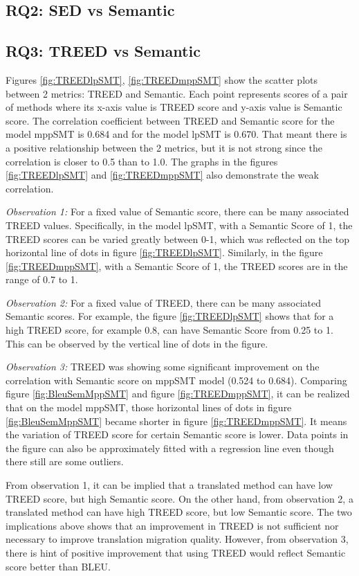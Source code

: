 \subsection{RQ2: SED vs Semantic}

\subsection{RQ3: TREED vs Semantic}
Figures \ref{fig:TREEDlpSMT}, \ref{fig:TREEDmppSMT}  show the scatter plots between 2 metrics: TREED and Semantic. Each point represents scores of a pair of methods where its x-axis value is TREED score and y-axis value is Semantic score.
The correlation coefficient between TREED and Semantic score for the model mppSMT is 0.684 and for the model lpSMT is 0.670. That meant there is a positive relationship between the 2 metrics, but it is not strong since the correlation is closer to 0.5 than to 1.0. The graphs in the figures  \ref{fig:TREEDlpSMT} and \ref{fig:TREEDmppSMT}  also demonstrate the weak correlation.

\emph{Observation 1:} For a fixed value of Semantic score, there can be many associated TREED values. Specifically, in the model lpSMT, with a Semantic Score of 1, the TREED scores can be varied greatly between 0-1, which was reflected on the top horizontal line of dots in figure \ref{fig:TREEDlpSMT}. Similarly, in the figure \ref{fig:TREEDmppSMT}, with a Semantic Score of 1, the TREED scores are in the range of 0.7 to 1. 

\emph{Observation 2:} For a fixed value of TREED, there can be many associated Semantic scores. For example, the figure \ref{fig:TREEDlpSMT} shows that for a high TREED score, for example 0.8, can have Semantic Score from 0.25 to 1. This can be observed by the vertical line of dots in the figure. 

\emph{Observation 3:} TREED was showing some significant improvement on the correlation with Semantic score on mppSMT model (0.524 to 0.684). Comparing figure \ref{fig:BleuSemMppSMT} and figure \ref{fig:TREEDmppSMT}, it can be realized that on the model mppSMT, those horizontal lines of dots in figure \ref{fig:BleuSemMppSMT} became shorter in figure \ref{fig:TREEDmppSMT}. It means the variation of TREED score for certain Semantic score is lower. Data points in the figure can also be approximately fitted with a regression line even though there still are some outliers. 

From observation 1, it can be implied that a translated method can have low TREED score, but high Semantic score. On the other hand, from observation 2, a translated method can have high TREED score, but low Semantic score. The two implications above shows that an improvement in TREED is not sufficient nor necessary to improve translation migration quality. However, from observation 3, there is hint of positive improvement that using TREED would reflect Semantic score better than BLEU. 

